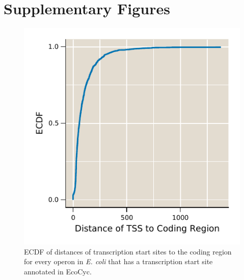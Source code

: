 \section*{Supplementary Figures}
\begin{figure}
    \centering
    \includegraphics{../figures/tss_CR_distance.pdf}
    \caption{ECDF of distances of transcription start sites to the coding region for every operon in \textit{E. coli} that has a transcription start site annotated in EcoCyc. }
    \label{fig:tss_distance}
\end{figure}


